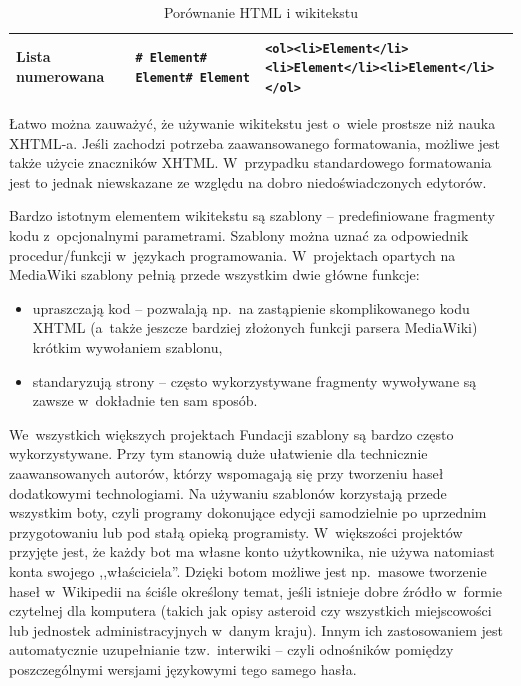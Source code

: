 \documentclass{pracamgr}
\begin{document}
\begin{table}[h]
\begin{center}
{\begin{tabularx}{\textwidth}{ |l|X|X| }
		\hline Lista numerowana & \texttt{\# Element\newline \# Element\newline \# Element}
		 & \texttt{<ol>\newline <li>Element</li>\newline <li>Element</li>\newline <li>Element</li>\newline </ol>}\\
		\hline
	\end{tabularx}
}
\caption{Porównanie HTML i wikitekstu}
\end{center}
\end{table}

Łatwo można zauważyć, że używanie wikitekstu jest o~wiele prostsze niż nauka XHTML-a. Jeśli zachodzi potrzeba zaawansowanego formatowania, możliwe jest także użycie znaczników XHTML. W~przypadku standardowego formatowania jest to jednak niewskazane ze względu na dobro niedoświadczonych edytorów.

Bardzo istotnym elementem wikitekstu są szablony -- predefiniowane fragmenty kodu z~opcjonalnymi parametrami. Szablony można uznać za odpowiednik procedur/funkcji w~językach programowania. W~projektach opartych na MediaWiki szablony pełnią przede wszystkim dwie główne funkcje:
\begin{itemize}
	\item upraszczają kod -- pozwalają np.\ na zastąpienie skomplikowanego kodu XHTML (a~także jeszcze bardziej złożonych funkcji parsera MediaWiki) krótkim wywołaniem szablonu,
	\item standaryzują strony -- często wykorzystywane fragmenty wywoływane są zawsze w~dokładnie ten sam sposób.
\end{itemize}
We~wszystkich większych projektach Fundacji szablony są bardzo często wykorzystywane. Przy tym stanowią duże ułatwienie dla technicznie zaawansowanych autorów, którzy wspomagają się przy tworzeniu haseł dodatkowymi technologiami. Na używaniu szablonów korzystają przede wszystkim boty, czyli programy dokonujące edycji samodzielnie po uprzednim przygotowaniu lub pod stałą opieką programisty. W~większości projektów przyjęte jest, że każdy bot ma własne konto użytkownika, nie używa natomiast konta swojego ,,właściciela''. Dzięki botom możliwe jest np.\ masowe tworzenie haseł w~Wikipedii na ściśle określony temat, jeśli istnieje dobre źródło w~formie czytelnej dla komputera (takich jak opisy asteroid czy wszystkich miejscowości lub jednostek administracyjnych w~danym kraju). Innym ich zastosowaniem jest automatycznie uzupełnianie tzw.\ interwiki -- czyli odnośników pomiędzy poszczególnymi wersjami językowymi tego samego hasła.
\end{document}

